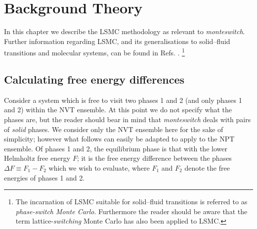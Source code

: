 \documentclass{report}
\begin{document}
\chapter{Background Theory}\label{chapter:background}
In this chapter we describe the LSMC methodology as relevant to \emph{monteswitch}. Further information regarding LSMC,
and its generalisations to solid--fluid transitions and molecular systems, can be found in Refs.  
\cite{Bruce_1997,Bruce_2000,Wilding_2000,Jackson_2002,Errington_2004,McNeil-Watson_2006,Jackson_2007,Bridgwater_2014}.
\footnote{The incarnation of LSMC suitable for solid--fluid transitions is referred to as \emph{phase-switch Monte Carlo}. Furthermore
the reader should be aware that the term lattice-\emph{switching} Monte Carlo has also been applied to LSMC.}

\section{Calculating free energy differences}
Consider a system which is free to visit two phases 1 and 2 (and only phases 1 and 2) within the NVT ensemble. At this point we do not specify what the
phases are, but the reader should bear in mind that \emph{monteswitch} deals with pairs of \emph{solid} phases. We consider only
the NVT ensemble here for the sake of simplicity; however what follows can easily be adapted to apply to the NPT ensemble.
Of phases 1 and 2, the equilibrium phase is that with the lower Helmholtz free energy $F$; it is the free energy difference between the phases 
$\Delta F\equiv F_1-F_2$ which we wish to evaluate, where $F_1$ and $F_2$ denote the free energies of phases 1 and 2.
\end{document}
